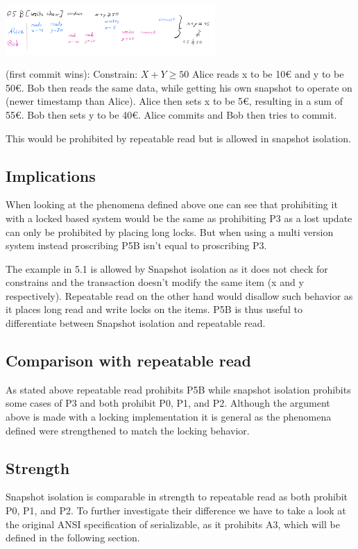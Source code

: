 \documentclass[sigconf, review=true]{acmart}
\begin{document}
\includegraphics[width=8cm]{P5}
\begin{example}
    (first commit wins):
    Constrain: $ X+Y \geq  50$
    Alice reads x to be 10€ and y to be 50€. Bob then reads the same data, while getting his own snapshot
    to operate on (newer timestamp than Alice). Alice then sets x to be 5€,
    resulting in a sum of 55€. Bob then sets y to be 40€. Alice commits and Bob then tries to commit.
\end{example}
This would be prohibited by repeatable read but is allowed in snapshot isolation.
\subsection{Implications}
When looking at the phenomena defined above one can see that prohibiting it with a locked based system
would be the same as prohibiting P3 as a lost update can only be prohibited by placing long locks.
But when using a multi version system instead proscribing P5B isn't equal to proscribing P3.

The example in 5.1 is allowed by Snapshot isolation as it does not check for constrains and the transaction
doesn't modify the same item (x and y respectively). Repeatable read on the other hand would disallow such
behavior as it places long read and write locks on the items.
P5B is thus useful to differentiate between Snapshot isolation and repeatable read.
\subsection{Comparison with repeatable read}
As stated above repeatable read prohibits P5B while snapshot isolation prohibits some cases of
P3 and both prohibit P0, P1, and P2. Although the argument above is made with a locking implementation
it is general as the phenomena defined were strengthened to match the locking behavior.
\subsection{Strength}
Snapshot isolation is comparable in strength to repeatable read as both prohibit P0, P1, and P2.
To further investigate their difference we have to take a look at the original ANSI specification of serializable,
as it prohibits A3, which will be defined in the following section.
\end{document}

